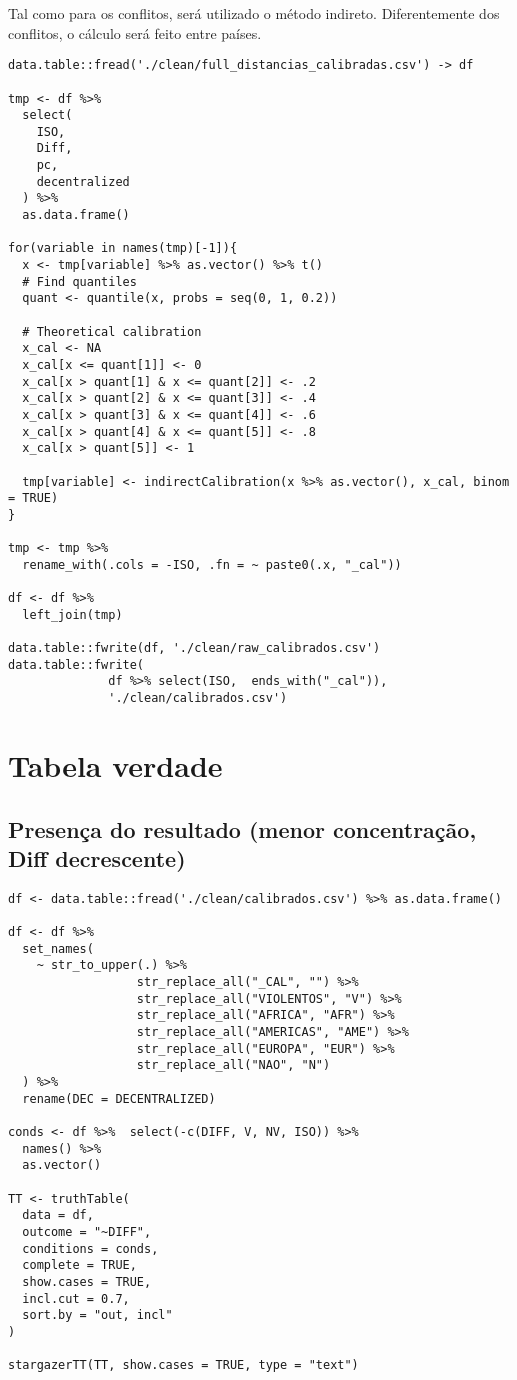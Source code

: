 \documentclass[11pt]{article}
\begin{document}
Tal como para os conflitos, será utilizado o método indireto.
Diferentemente dos conflitos, o cálculo será feito entre países.

\begin{verbatim}
data.table::fread('./clean/full_distancias_calibradas.csv') -> df

tmp <- df %>%
  select(
    ISO,
    Diff,
    pc,
    decentralized
  ) %>%
  as.data.frame()

for(variable in names(tmp)[-1]){
  x <- tmp[variable] %>% as.vector() %>% t()
  # Find quantiles
  quant <- quantile(x, probs = seq(0, 1, 0.2))

  # Theoretical calibration
  x_cal <- NA
  x_cal[x <= quant[1]] <- 0
  x_cal[x > quant[1] & x <= quant[2]] <- .2
  x_cal[x > quant[2] & x <= quant[3]] <- .4
  x_cal[x > quant[3] & x <= quant[4]] <- .6
  x_cal[x > quant[4] & x <= quant[5]] <- .8
  x_cal[x > quant[5]] <- 1

  tmp[variable] <- indirectCalibration(x %>% as.vector(), x_cal, binom = TRUE)
}

tmp <- tmp %>%
  rename_with(.cols = -ISO, .fn = ~ paste0(.x, "_cal"))

df <- df %>%
  left_join(tmp)

data.table::fwrite(df, './clean/raw_calibrados.csv')
data.table::fwrite(
              df %>% select(ISO,  ends_with("_cal")),
              './clean/calibrados.csv')
\end{verbatim}


\section*{Tabela verdade}
\label{sec:org4f1ec1d}

\subsection*{Presença do resultado (menor concentração, Diff decrescente)}
\label{sec:org7dced2b}

\begin{verbatim}
df <- data.table::fread('./clean/calibrados.csv') %>% as.data.frame()

df <- df %>%
  set_names(
    ~ str_to_upper(.) %>%
                  str_replace_all("_CAL", "") %>%
                  str_replace_all("VIOLENTOS", "V") %>%
                  str_replace_all("AFRICA", "AFR") %>%
                  str_replace_all("AMERICAS", "AME") %>%
                  str_replace_all("EUROPA", "EUR") %>%
                  str_replace_all("NAO", "N")
  ) %>%
  rename(DEC = DECENTRALIZED)

conds <- df %>%  select(-c(DIFF, V, NV, ISO)) %>%
  names() %>%
  as.vector()

TT <- truthTable(
  data = df,
  outcome = "~DIFF",
  conditions = conds,
  complete = TRUE,
  show.cases = TRUE,
  incl.cut = 0.7,
  sort.by = "out, incl"
)

stargazerTT(TT, show.cases = TRUE, type = "text")
\end{verbatim}
\end{document}

